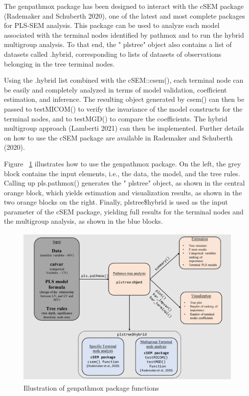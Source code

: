 The genpathmox package has been designed to interact with the cSEM
package (Rademaker and Schuberth 2020), one of the latest and most complete packages for
PLS-SEM analysis. This package can be used to analyze each model
associated with the terminal nodes identified by pathmox and to run the
hybrid multigroup analysis. To that end, the " plstree" object also
contains a list of datasets called .hybrid, corresponding to lists of
datasets of observations belonging in the tree terminal nodes.

Using the .hybrid list combined with the cSEM::csem(), each terminal
node can be easily and completely analyzed in terms of model validation,
coefficient estimation, and inference. The resulting object generated by
csem() can then be passed to testMICOM() to verify the invariance of the
model constructs for the terminal nodes, and to testMGD() to compare the
coefficients. The hybrid multigroup approach (Lamberti 2021) can then be
implemented. Further details on how to use the cSEM package are
available in Rademaker and Schuberth (2020).

Figure ~\protect\hyperlink{figure:flow}{1}
illustrates how to use the genpathmox package. On the left, the grey
block contains the input elements, i.e., the data, the model, and the
tree rules. Calling up pls.pathmox() generates the " plstree" object,
as shown in the central orange block, which yields estimation and
visualization results, as shown in the two orange blocks on the right.
Finally, plstree\$hybrid is used as the input parameter of the cSEM
package, yielding full results for the terminal nodes and the multigroup
analysis, as shown in the blue blocks.

\begin{figure}
\hypertarget{figure:flow}{%
\centering
\includegraphics[width=\textwidth,height=8cm]{Fig1_flow.pdf}
\caption{Illustration of genpathmox package
functions}\label{figure:flow}
}
\end{figure}

